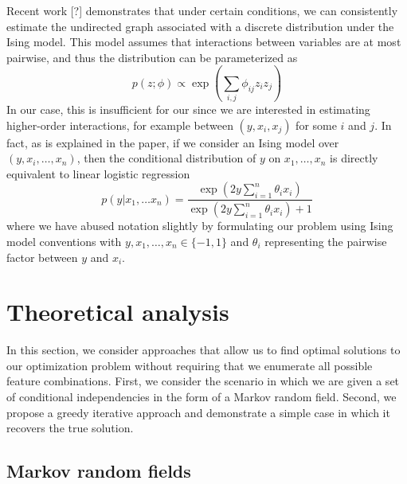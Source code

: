 \documentclass[12pt]{article}
\begin{document}
Recent work [?] demonstrates that under certain conditions, we can consistently estimate the undirected graph associated with a discrete distribution under the Ising model. This model assumes that interactions between variables are at most pairwise, and thus the distribution can be parameterized as
\begin{equation}
p(z;\phi) \propto \exp \left( \sum_{i,j} \phi_{ij}z_iz_j \right)
\end{equation}
In our case, this is insufficient for our since we are interested in estimating higher-order interactions, for example between $(y,x_i,x_j)$ for some $i$ and $j$. In fact, as is explained in the paper, if we consider an Ising model over $(y,x_i,\ldots,x_n)$, then the conditional distribution of $y$ on $x_1,\ldots,x_n$ is directly equivalent to linear logistic regression
\begin{equation}
p(y|x_1,\ldots x_n) = \frac{\exp(2 y\sum_{i=1}^n\theta_ix_i)}{\exp(2 y\sum_{i=1}^n\theta_ix_i) + 1}
\end{equation}
where we have abused notation slightly by formulating our problem using Ising model conventions with $y,x_1,\ldots,x_n \in \{-1,1\}$ and $\theta_i$ representing the pairwise factor between $y$ and $x_i$.

\section{Theoretical analysis}

In this section, we consider approaches that allow us to find optimal solutions to our optimization problem without requiring that we enumerate all possible feature combinations. First, we consider the scenario in which we are given a set of conditional independencies in the form of a Markov random field. Second, we propose a greedy iterative approach and demonstrate a simple case in which it recovers the true solution.

\subsection{Markov random fields}
\end{document}
